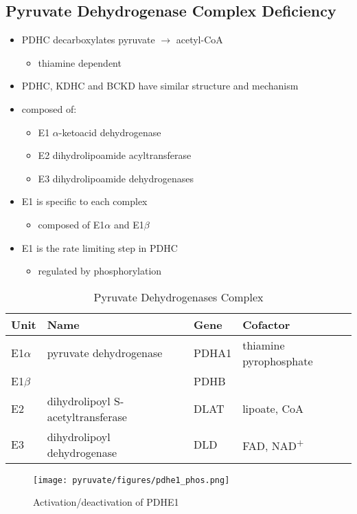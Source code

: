 \documentclass[12pt]{scrartcl}
\begin{document}
\subsection{Pyruvate Dehydrogenase Complex Deficiency}
\label{sec:org6432b60}
\begin{itemize}
\item PDHC decarboxylates pyruvate \(\to\) acetyl-CoA
\begin{itemize}
\item thiamine dependent
\end{itemize}
\item PDHC, KDHC and BCKD have similar structure and mechanism
\item composed of:
\begin{itemize}
\item E1 \(\alpha\)-ketoacid dehydrogenase
\item E2 dihydrolipoamide acyltransferase
\item E3 dihydrolipoamide dehydrogenases
\end{itemize}
\item E1 is specific to each complex
\begin{itemize}
\item composed of E1\(\alpha\) and E1\(\beta\)
\end{itemize}
\item E1 is the rate limiting step in PDHC
\begin{itemize}
\item regulated by phosphorylation
\end{itemize}
\end{itemize}

\begin{table}[htbp]
\caption{\label{tab:orgf32f5fc}Pyruvate Dehydrogenases Complex}
\centering
\begin{tabular}{llll}
Unit & Name & Gene & Cofactor\\
\hline
E1\(\alpha\) & pyruvate dehydrogenase & PDHA1 & thiamine pyrophosphate\\
E1\(\beta\) &  & PDHB & \\
E2 & dihydrolipoyl  S-acetyltransferase & DLAT & lipoate, CoA\\
E3 & dihydrolipoyl dehydrogenase & DLD & FAD, NAD\textsuperscript{+}\\
\end{tabular}
\end{table}

\begin{figure}[htbp]
\centering
\texttt{[image: pyruvate/figures/pdhe1\_phos.png]}
\caption[pdhe1]{\label{fig:org40be0c1}Activation/deactivation of PDHE1}
\end{figure}
\end{document}
